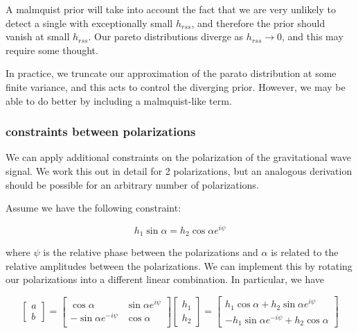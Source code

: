 \documentclass[10pt]{article}
\begin{document}
A malmquist prior will take into account the fact that we are very unlikely to detect a single with exceptionally small $h_{rss}$, and therefore the prior should vanish at small $h_{rss}$. Our pareto distributions diverge as $h_{rss}\rightarrow0$, and this may require some thought.

In practice, we truncate our approximation of the parato distribution at some finite variance, and this acts to control the diverging prior. However, we may be able to do better by including a malmquist-like term.


\subsubsection{constraints between polarizations}

We can apply additional constraints on the polarization of the gravitational wave signal. We work this out in detail for 2 polarizations, but an analogous derivation should be possible for an arbitrary number of polarizations.

Assume we have the following constraint:

\begin{equation}
h_1\sin\alpha = h_2 \cos\alpha e^{i\psi}
\end{equation}

where $\psi$ is the relative phase between the polarizations and $\alpha$ is related to the relative amplitudes between the polarizations. We can implement this by rotating our polarizations into a different linear combination. In particular, we have

\begin{equation}
\begin{bmatrix}
a \\ 
b
\end{bmatrix}
=
\begin{bmatrix}
\cos\alpha & \sin\alpha e^{i\psi} \\
-\sin\alpha e^{-i\psi} & \cos\alpha \\
\end{bmatrix}
\begin{bmatrix}
h_1 \\
h_2
\end{bmatrix}
= 
\begin{bmatrix}
h_1\cos\alpha + h_2\sin\alpha e^{i\psi} \\
-h_1\sin\alpha e^{-i\psi} + h_2\cos\alpha
\end{bmatrix}
\end{equation}
\end{document}
